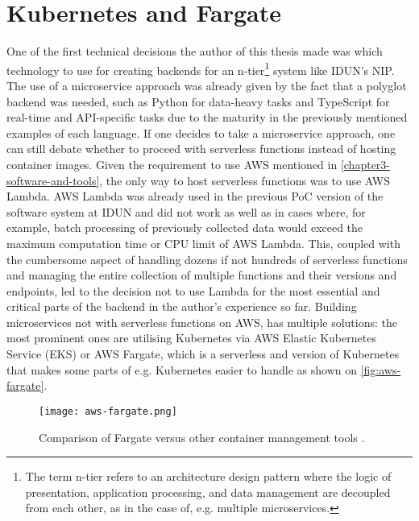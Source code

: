 \section*{Kubernetes and Fargate}
\label{chapter4-kubernetes-and-aws-fargate}

One of the first technical decisions the author of this thesis made was which technology to use for creating backends for an n-tier\footnote{The term n-tier refers to an architecture design pattern where the logic of presentation, application processing, and data management are decoupled from each other, as in the case of, e.g. multiple microservices.} system like IDUN's NIP. The use of a microservice approach was already given by the fact that a polyglot backend was needed, such as Python for data-heavy tasks and TypeScript for real-time and API-specific tasks due to the maturity in the previously mentioned examples of each language. If one decides to take a microservice approach, one can still debate whether to proceed with serverless functions instead of hosting container images. Given the requirement to use AWS mentioned in \autoref{chapter3-software-and-tools}, the only way to host serverless functions was to use AWS Lambda. AWS Lambda was already used in the previous PoC version of the software system at IDUN and did not work as well as in cases where, for example, batch processing of previously collected data would exceed the maximum computation time or CPU limit of AWS Lambda. This, coupled with the cumbersome aspect of handling dozens if not hundreds of serverless functions and managing the entire collection of multiple functions and their versions and endpoints, led to the decision not to use Lambda for the most essential and critical parts of the backend in the author's experience so far. Building microservices not with serverless functions on AWS, has multiple solutions: the most prominent ones are utilising Kubernetes via AWS Elastic Kubernetes Service (EKS) or AWS Fargate, which is a serverless and version of Kubernetes \citep{amazon_web_services_inc_serverless_nodate} that makes some parts of e.g. Kubernetes easier to handle as shown on \autoref{fig:aws-fargate}.

\begin{figure}[!ht]
  \centering
  \texttt{[image: aws-fargate.png]}
  \caption[Comparison of Fargate versus other container management tools]{Comparison of Fargate versus other container management tools \citep{amazon_web_services_inc_serverless_nodate}.}
  \label{fig:aws-fargate}
\end{figure}

